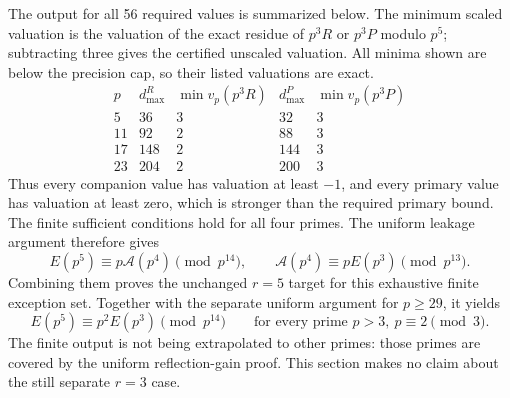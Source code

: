 \documentclass[11pt,letterpaper]{article}
\numberwithin{equation}{section}
\begin{document}
The output for all 56 required values is summarized below. The
minimum scaled valuation is the valuation of the exact residue of
$p^3R$ or $p^3P$ modulo $p^5$; subtracting three gives the certified
unscaled valuation. All minima shown are below the precision cap,
so their listed valuations are exact.
\[
\begin{array}{c|r|r|r|r}
p&d_{\max}^{R}&\min v_p(p^3R)&d_{\max}^{P}&\min v_p(p^3P)\\\hline
5 &36 &3&32 &3\\
11&92 &2&88 &3\\
17&148&2&144&3\\
23&204&2&200&3
\end{array}
\]
Thus every companion value has valuation at least $-1$, and every
primary value has valuation at least zero, which is stronger than the
required primary bound. The finite sufficient conditions hold for
all four primes. The uniform leakage argument therefore gives
\[
 E(p^5)\equiv p\mathcal A(p^4)\pmod{p^{14}},\qquad
 \mathcal A(p^4)\equiv pE(p^3)\pmod{p^{13}}.
\]
Combining them proves the unchanged $r=5$ target for this exhaustive
finite exception set. Together with the separate uniform argument
for $p\ge29$, it yields
\[
 \boxed{E(p^5)\equiv p^2E(p^3)\pmod{p^{14}}
 \qquad\text{for every prime }p>3,\ p\equiv2\pmod3.}
\]
The finite output is not being extrapolated to other primes: those
primes are covered by the uniform reflection-gain proof. This section
makes no claim about the still separate $r=3$ case.
\end{document}

